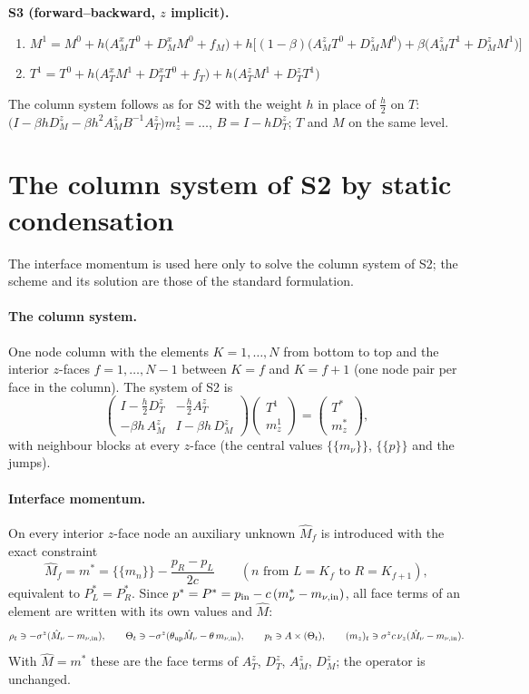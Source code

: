 \documentclass[11pt,a4paper]{article}
\newcommand{\avg}[1]{\{\!\{#1\}\!\}}
\begin{document}
\medskip\noindent\textbf{S3 (forward--backward, $z$ implicit).}
\begin{enumerate}
\item $M^1=M^0+h\big(A_M^xT^0+D_M^xM^0+f_M\big)+h\big[(1-\beta)\big(A_M^zT^0+D_M^zM^0\big)+\beta\big(A_M^zT^1+D_M^zM^1\big)\big]$
\item $T^1=T^0+h\big(A_T^xM^1+D_T^xT^0+f_T\big)+h\big(A_T^zM^1+D_T^zT^1\big)$
\end{enumerate}
The column system follows as for S2 with the weight $h$ in place of $\tfrac h2$ on $T$: $\big(I-\beta hD_M^z-\beta h^2A_M^zB^{-1}A_T^z\big)m_z^1=\dots$, $B=I-hD_T^z$;
$T$ and $M$ on the same level.

\section{The column system of S2 by static condensation}\label{sec:hdg}
The interface momentum is used here only to solve the column system of S2; the scheme and its solution are those of the
standard formulation.

\paragraph{The column system.} One node column with the elements $K=1,\dots,N$ from bottom to top and the interior $z$-faces
$f=1,\dots,N-1$ between $K=f$ and $K=f+1$ (one node pair per face in the column). The system of S2 is
\[
\begin{pmatrix}I-\tfrac h2D_T^z&-\tfrac h2A_T^z\\-\beta h\,A_M^z&I-\beta h\,D_M^z\end{pmatrix}\begin{pmatrix}T^1\\m_z^1\end{pmatrix}=\begin{pmatrix}T^*\\m_z^*\end{pmatrix},
\]
with neighbour blocks at every $z$-face (the central values $\avg{m_\nu}$, $\avg p$ and the jumps).

\paragraph{Interface momentum.} On every interior $z$-face node an auxiliary unknown $\hat M_f$ is introduced with the exact constraint
\[
\hat M_f=m^*=\avg{m_n}-\frac{p_R-p_L}{2c}\qquad(n\text{ from }L=K_f\text{ to }R=K_{f+1}),
\]
equivalent to $P^*_L=P^*_R$. Since $p^*=P^*=p_{\rm in}-c\,(m^*_\nu-m_{\nu,\rm in})$, all face terms of an element are written with its own values
and $\hat M$:
\[
\rho_t\ni-\sigma^z(\hat M_\nu-m_{\nu,\rm in}),\qquad \Theta_t\ni-\sigma^z(\theta_{\rm up}\hat M_\nu-\theta\,m_{\nu,\rm in}),\qquad p_t\ni A\times(\Theta_t),\qquad
(m_z)_t\ni\sigma^zc\,\nu_z(\hat M_\nu-m_{\nu,\rm in}).
\]
With $\hat M=m^*$ these are the face terms of $A_T^z$, $D_T^z$, $A_M^z$, $D_M^z$; the operator is unchanged.
\end{document}

